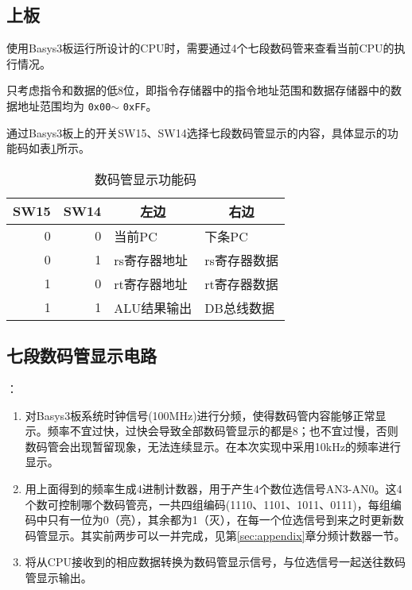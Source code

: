 
\subsection{上板}
\qquad 使用Basys3板运行所设计的CPU时，需要通过4个七段数码管来查看当前CPU的执行情况。
\par 只考虑指令和数据的低8位，即指令存储器中的指令地址范围和数据存储器中的数据地址范围均为 \verb'0x00'$\sim$ \verb'0xFF'。
\par 通过Basys3板上的开关SW15、SW14选择七段数码管显示的内容，具体显示的功能码如表\ref{tab:seg_code}所示。
\begin{table}[htbp]
  \centering\wuhao
  \caption{数码管显示功能码}
    \begin{tabular}{|r|r|l|l|}
    \hline
    \multicolumn{1}{|c|}{SW15} & \multicolumn{1}{c|}{SW14} & \multicolumn{1}{c|}{左边} & \multicolumn{1}{c|}{右边} \bigstrut\\
    \hline
    0     & 0     & 当前PC  & 下条PC \bigstrut\\
    \hline
    0     & 1     & rs寄存器地址 & rs寄存器数据 \bigstrut\\
    \hline
    1     & 0     & rt寄存器地址 & rt寄存器数据 \bigstrut\\
    \hline
    1     & 1     & ALU结果输出 & DB总线数据 \bigstrut\\
    \hline
    \end{tabular}%
  \label{tab:seg_code}%
\end{table}%

\subsection{七段数码管显示电路}
：
\begin{enumerate}
    \item 对Basys3板系统时钟信号(100MHz)进行分频，使得数码管内容能够正常显示。频率不宜过快，过快会导致全部数码管显示的都是8；也不宜过慢，否则数码管会出现暂留现象，无法连续显示。在本次实现中采用10kHz的频率进行显示。
    \item 用上面得到的频率生成4进制计数器，用于产生4个数位选信号AN3-AN0。这4个数可控制哪个数码管亮，一共四组编码(1110、1101、1011、0111)，每组编码中只有一位为0（亮），其余都为1（灭），在每一个位选信号到来之时更新数码管显示。其实前两步可以一并完成，见第\ref{sec:appendix}章分频计数器一节。
    \item 将从CPU接收到的相应数据转换为数码管显示信号，与位选信号一起送往数码管显示输出。
\end{enumerate}

